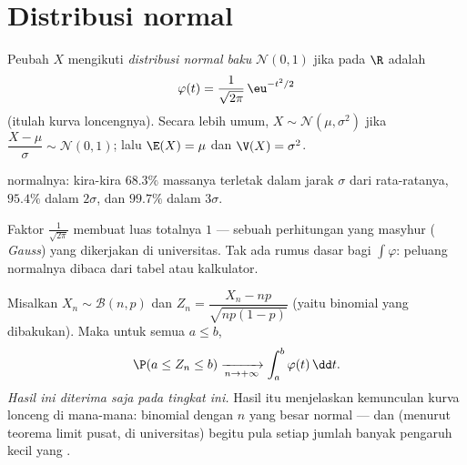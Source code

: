 \section{Distribusi normal}

\begin{definition}\label{def:g12:contdist:normal}
Peubah $X$ mengikuti \emph{distribusi normal baku}
$\mathcal N(0, 1)$ jika  pada $\R$ adalah
\[
\varphi(t) = \frac{1}{\sqrt{2\pi}}\,\eu^{-t^2/2}
\]
(itulah kurva loncengnya). Secara lebih umum,
$X \sim \mathcal N(\mu, \sigma^2)$ jika $\dfrac{X - \mu}{\sigma} \sim
\mathcal N(0,1)$; lalu $\E(X) = \mu$ dan $\V(X) = \sigma^2$.
\end{definition}

\begin{omfigure}

{\small {} normalnya: kira-kira $68.3\%$ massanya terletak dalam jarak
$\sigma$ dari rata-ratanya, $95.4\%$ dalam $2\sigma$, dan $99.7\%$ dalam
$3\sigma$.}
\end{omfigure}

\begin{remark}
Faktor $\frac{1}{\sqrt{2\pi}}$ membuat luas totalnya $1$ --- sebuah perhitungan
yang masyhur (\emph{ Gauss}) yang dikerjakan di universitas. Tak ada
rumus dasar bagi $\int \varphi$: peluang normalnya dibaca dari
tabel atau kalkulator.
\end{remark}

\begin{theorem}\label{thm:g12:contdist:tcl}
Misalkan $X_n \sim \mathcal B(n, p)$ dan
$Z_n = \dfrac{X_n - np}{\sqrt{np(1-p)}}$ (yaitu binomial yang dibakukan). Maka
untuk semua $a \leq b$,
\[
\P(a \leq Z_n \leq b) \xrightarrow[n\to+\infty]{}
\int_a^b \varphi(t)\,\dd t .
\]
\emph{Hasil ini diterima saja pada tingkat ini.} Hasil itu menjelaskan kemunculan
kurva lonceng di mana-mana: binomial dengan $n$ yang besar  normal
--- dan (menurut teorema limit pusat, di universitas) begitu pula setiap jumlah banyak
pengaruh kecil yang .
\end{theorem}


